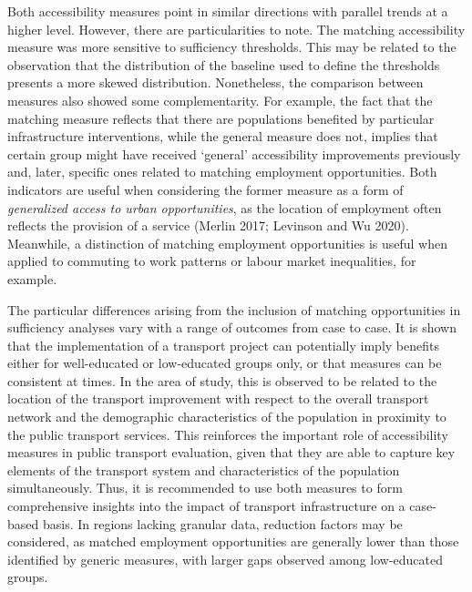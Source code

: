 \documentclass{article}
\begin{document}
Both accessibility measures point in similar directions with parallel
trends at a higher level. However, there are particularities to note.
The matching accessibility measure was more sensitive to sufficiency
thresholds. This may be related to the observation that the distribution
of the baseline used to define the thresholds presents a more skewed
distribution. Nonetheless, the comparison between measures also showed
some complementarity. For example, the fact that the matching measure
reflects that there are populations benefited by particular
infrastructure interventions, while the general measure does not,
implies that certain group might have received `general' accessibility
improvements previously and, later, specific ones related to matching
employment opportunities. Both indicators are useful when considering
the former measure as a form of \emph{generalized access to urban
opportunities}, as the location of employment often reflects the
provision of a service (Merlin 2017; Levinson and Wu 2020). Meanwhile, a
distinction of matching employment opportunities is useful when applied
to commuting to work patterns or labour market inequalities, for
example.

The particular differences arising from the inclusion of matching
opportunities in sufficiency analyses vary with a range of outcomes from
case to case. It is shown that the implementation of a transport project
can potentially imply benefits either for well-educated or low-educated
groups only, or that measures can be consistent at times. In the area of
study, this is observed to be related to the location of the transport
improvement with respect to the overall transport network and the
demographic characteristics of the population in proximity to the public
transport services. This reinforces the important role of accessibility
measures in public transport evaluation, given that they are able to
capture key elements of the transport system and characteristics of the
population simultaneously. Thus, it is recommended to use both measures
to form comprehensive insights into the impact of transport
infrastructure on a case-based basis. In regions lacking granular data,
reduction factors may be considered, as matched employment opportunities
are generally lower than those identified by generic measures, with
larger gaps observed among low-educated groups.
\end{document}
